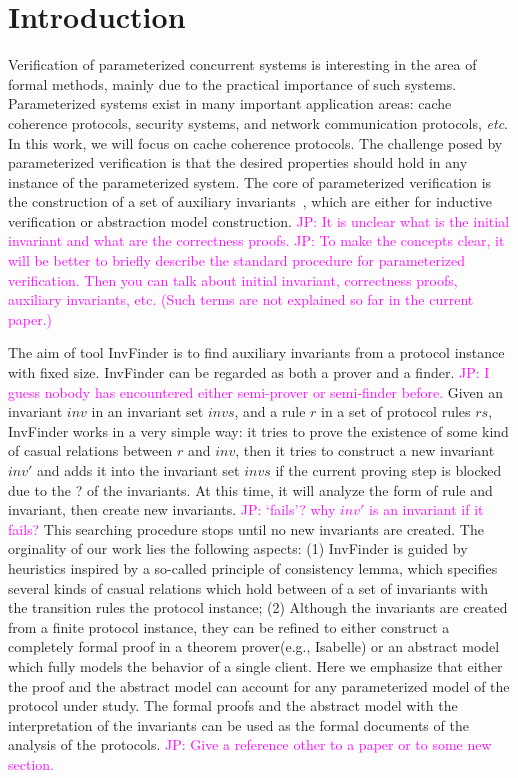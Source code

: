 \documentclass{llncs}
\newcommand\JP[1]{\textcolor{magenta}{JP: #1}}
\begin{document}
\section{Introduction}
Verification of parameterized concurrent systems is
interesting in the area of formal methods,
mainly due to the practical importance of such systems.
Parameterized systems exist in many
important application areas: cache coherence protocols, security
systems, and network communication protocols,
\emph{etc}. In this work, we will focus on cache coherence
protocols. The challenge posed by
parameterized verification is that the desired properties should hold in any instance of the parameterized system. The core of parameterized verification is the construction of a set of auxiliary invariants~\cite{Pnueli2001,Chou2004,Pandav2005,cubicle2011},
which are either for inductive verification or abstraction model construction.
\JP{It is unclear what is the initial invariant and what are the correctness proofs.}
\JP{To make the concepts clear, it will be better to briefly describe the standard
procedure for parameterized verification.
Then you can talk about initial invariant, correctness proofs, auxiliary invariants, etc.
(Such terms are not explained so far in the current paper.)}

The aim of tool {\sf InvFinder} is to find auxiliary invariants from a protocol
instance with fixed size.
{\sf InvFinder} can be regarded as both a  prover and a finder.
\JP{I guess nobody has encountered either semi-prover or semi-finder before.}
Given an invariant $inv$ in an invariant set $invs$,
and a rule $r$ in a set of protocol rules $rs$,
{\sf InvFinder} works in a very simple way:  it tries to prove the
existence of some kind of casual relations between $r$ and $inv$,
then it tries to construct a new invariant $inv'$ and adds it into the invariant set $invs$
if the current proving step is blocked due to the ? of the invariants. At this time, it will analyze the form of rule and
 invariant, then create new invariants.
\JP{`fails'? why $inv'$ is an invariant if it fails?}
This searching procedure stops until no new invariants are created.
The orginality of our work lies the following aspects: (1)
{\sf InvFinder} is guided by heuristics inspired by a so-called principle of consistency lemma,
 which specifies several kinds of  casual relations which hold between  of a set of invariants with the transition rules the protocol instance; \cite{LPParamterProof} (2)
 Although the invariants are created from a finite protocol instance, they can be refined to either construct a completely formal proof   in a theorem prover(e.g., Isabelle) or an abstract model which fully models the behavior of a single client. Here we emphasize that either the proof and the abstract model
  can  account for any parameterized model of the protocol under study. The formal proofs and the abstract model with the interpretation of the invariants can be used as the formal documents of the analysis of the protocols.
\JP{Give a reference other to a paper or to some new section.}
\end{document}
